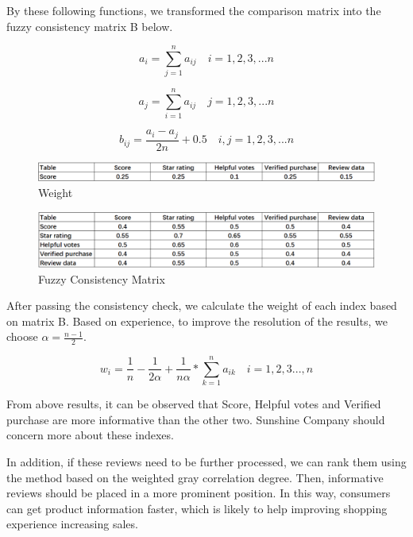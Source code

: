 \documentclass[12pt]{article}  %
\begin{document}
By these following functions, we transformed the comparison matrix into the fuzzy consistency matrix B below.

\begin{equation}\label{eq:1}
a_i = \sum\limits_{j=1}^{n} a_{ij}  \quad i=1,2,3,...n
\end{equation}

\begin{equation}\label{eq:2}
a_j = \sum\limits_{i=1}^{n} a_{ij}  \quad j=1,2,3,...n
\end{equation}

\begin{equation}\label{eq:3}
b_{ij} = \frac{a_i-a_j} {2n} + 0.5  \quad i,j=1,2,3,...n
\end{equation}


\begin{figure}[!htbp]
\centering
\includegraphics[width=.6\textwidth]{weight.png}
\caption{Weight}\label{fig:weights}
\end{figure}

\begin{figure}[!htbp]
\centering
\includegraphics[width=.6\textwidth]{z1.png}
\caption{Fuzzy Consistency Matrix}\label{fig:Fuzzy Consistency Matrix}
\end{figure}

After passing the consistency check, we calculate the weight of each index based on matrix B. Based on experience, to improve the resolution of the results, we choose $\alpha=\frac{n-1}{2}$.

\begin{equation}\label{eq:1}
w_i = \frac{1}{n} - \frac{1}{2\alpha} + \frac{1}{n\alpha} * \sum\limits_{k=1}^n a_{ik} \quad i=1,2,3...,n
\end{equation}

From above results, it can be observed that Score, Helpful votes and Verified purchase are more informative than the other two. Sunshine Company should concern more about these indexes.


In addition, if these reviews need to be further processed, we can rank them using the method based on the weighted gray correlation degree. Then, informative reviews should be placed in a more prominent position. In this way, consumers can get product information faster, which is likely to help improving shopping experience increasing sales.
\end{document}
